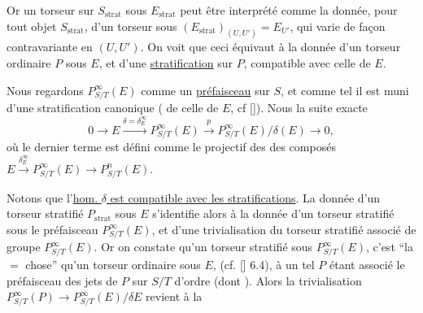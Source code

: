 Or un torseur sur $S_{\mathrm{strat}}$ sous $E_{\mathrm{strat}}$ peut être interprété
comme la donnée, pour tout objet   $S_{\mathrm{strat}}$, d'un
torseur sous $(E_{\mathrm{strat}})_{(U,U')}=E_{U'}$,  qui varie de façon
contravariante en $(U,U')$. On voit que ceci équivaut
à la donnée d'un torseur ordinaire $P$ sous $E$, et
d'une \uline{stratification} sur $P$, compatible avec celle de $E$.


 Nous regardons $P^\infty_{S/T}(E)$ comme un \uline{préfaisceau} 
sur $S$, et comme tel il est muni d'une stratification
canonique ( de celle de $E$, cf [\quad]).
Nous  la  suite exacte
\[
0\longrightarrow E\xrightarrow{\delta=\delta_E^\infty}P^\infty_{S/T}(E)
\xrightarrow{p}P^\infty_{S/T}(E)/\delta(E)\longrightarrow0, \tag*{(25)}
\]
où le dernier terme est défini comme le  projectif des  des composés
$E\xrightarrow{\delta_E^\infty}P^\infty_{S/T}(E)\longrightarrow P^n_{S/T}(E)$.

 Notons que l'\uline{hom. $\delta$ est compatible avec les
stratifications}. La donnée d'un torseur stratifié $P_{\mathrm{strat}}$
sous $E$ s'identifie alors à la donnée d'un
torseur stratifié sous le préfaisceau $P^\infty_{S/T}(E)$, et
d'une trivialisation  du  torseur stratifié associé
de groupe $P^\infty_{S/T}(E)$. Or on constate qu'un torseur
stratifié sous $P^\infty_{S/T}(E)$, c'est ``la $=$ chose'' qu'un
torseur ordinaire  sous $E$, (cf. [\quad] 6.4), à un
tel $P$ étant associé le préfaisceau  des 
jets de $P$ sur $S/T$ d'ordre  (dont \unsure{$-$|$\infty$}). Alors
la trivialisation $P^\infty_{S/T}(P)\longrightarrow P^\infty_{S/T}(E)/\delta E$ revient à la
